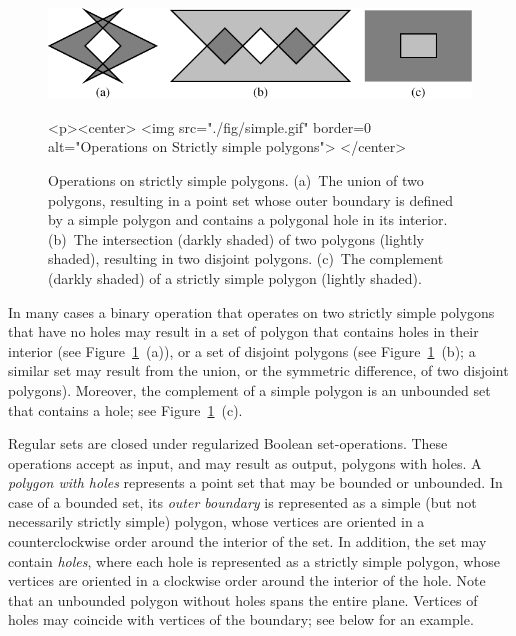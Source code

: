 \begin{figure}[!htp]
\begin{ccTexOnly}
  \begin{center}
  \includegraphics{Boolean_set_operations_2/fig/simple}
  \end{center}
\end{ccTexOnly}
\label{fig:simple}
\begin{ccHtmlOnly}
  <p><center>
    <img src="./fig/simple.gif" border=0 alt="Operations on Strictly
    simple polygons">
  </center>
\end{ccHtmlOnly}
\caption{Operations on strictly simple polygons. (a)~The union of two
polygons, resulting in a point set whose outer boundary is defined by
a simple polygon and contains a polygonal hole in its interior. (b)~The
intersection (darkly shaded) of two polygons (lightly shaded), resulting
in two disjoint polygons. (c)~The complement (darkly shaded) of a strictly
simple polygon (lightly shaded).} 
\end{figure}

In many cases a binary operation that operates on two strictly simple
polygons that have no holes may result in a set of polygon that
contains holes in their interior (see Figure~\ref{fig:simple}~(a)), 
or a set of disjoint polygons (see Figure~\ref{fig:simple}~(b); a similar
set may result from the union, or the symmetric difference, of two disjoint
polygons). Moreover, the complement of a simple polygon is an unbounded set
that contains a hole; see Figure~\ref{fig:simple}~(c).

Regular sets are closed under regularized Boolean set-operations.
These operations accept as input, and may result as output, polygons
with holes. A {\em polygon with holes} represents a point set that may
be bounded or unbounded. In case of a bounded set, its {\em outer
boundary} is represented as a simple (but not necessarily strictly
simple) polygon, whose vertices are oriented in a counterclockwise
order around the interior of the set. In addition, the set may contain
{\em holes}, where each hole is represented as a strictly simple
polygon, whose vertices are oriented in a clockwise order around the
interior of the hole. Note that an unbounded polygon without holes
spans the entire plane. Vertices of holes may coincide with vertices
of the boundary; see below for an example. 

